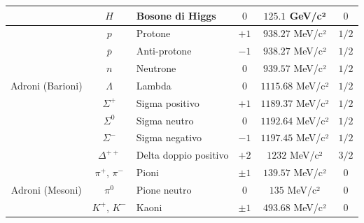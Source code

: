 \documentclass[10pt, a4paper]{scrartcl}
\numberwithin{equation}{subsection}
\theoremstyle{style1}
\begin{document}
\begin{table}[h!]
\begin{tabular}{|c|c|l|c|c|c|}
                                & $H$                 & Bosone di Higgs          & $0$                & $125.1$ GeV/c²         & $0$          \\
\hline
\multirow{7}{*}{Adroni (Barioni)} & $p$               & Protone                  & $+1$               & $938.27$ MeV/c²        & $1 / 2$ \\
				& $\overline{p}$      & Anti-protone                  & $-1$               & $938.27$ MeV/c²        & $1 / 2$ \\
                                & $n$                 & Neutrone                 & $0$                & $939.57$ MeV/c²        & $1 / 2$ \\
                                & $\Lambda$           & Lambda                   & $0$                & $1115.68$ MeV/c²       & $1 /2 $ \\
                                & $\Sigma^+$          & Sigma positivo           & $+1$               & $1189.37$ MeV/c²       & $1 / 2$ \\
                                & $\Sigma^0$          & Sigma neutro             & $0$                & $1192.64$ MeV/c²       & $1 / 2$ \\
                                & $\Sigma^-$          & Sigma negativo           & $-1$               & $1197.45$ MeV/c²       & $1 / 2$ \\
                                & $\Delta^{++}$       & Delta doppio positivo    & $+2$               & $1232$ MeV/c²          & $3 / 2$ \\
\hline
\multirow{3}{*}{Adroni (Mesoni)} & $\pi^+$, $\pi^-$    & Pioni                    & $\pm 1$            & $139.57$ MeV/c²        & $0$          \\
                                & $\pi^0$             & Pione neutro             & $0$                & $135$ MeV/c²           & $0$          \\
                                & $K^+$, $K^-$        & Kaoni                    & $\pm 1$            & $493.68$ MeV/c²        & $0$          \\
\hline
\end{tabular}
\end{table}
\end{document}
